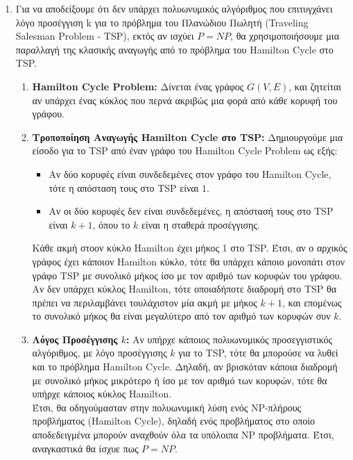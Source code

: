 \documentclass{article}
\begin{document}
\begin{enumerate}[label=(\alph*)]
\item Για να αποδείξουμε ότι δεν υπάρχει πολυωνυμικός αλγόριθμος που επιτυγχάνει λόγο προσέγγιση k για το πρόβλημα του Πλανώδιου Πωλητή (Traveling Salesman Problem - TSP), εκτός αν ισχύει $P = NP$, θα χρησιμοποιήσουμε μια παραλλαγή της κλασικής αναγωγής από το πρόβλημα του Hamilton Cycle στο TSP. \\
\begin{enumerate}[label=\arabic*]
\item \textbf{Hamilton Cycle Problem:} Δίνεται ένας γράφος $G(V,E)$, και ζητείται αν υπάρχει ένας κύκλος που περνά ακριβώς μια φορά από κάθε κορυφή του γράφου. 
\item \textbf{Τροποποίηση Αναγωγής Hamilton Cycle στο TSP:} Δημιουργούμε μια είσοδο για το TSP από έναν γράφο του Hamilton Cycle Problem ως εξής: \\
\begin{itemize} 
\item Αν δύο κορυφές είναι συνδεδεμένες στον γράφο του Hamilton Cycle, τότε η απόσταση τους στο TSP είναι $1$.
\item Αν οι δύο κορυφές δεν είναι συνδεδεμένες, η απόστασή τους στο TSP είναι $k+1$, όπου το $k$ είναι η σταθερά προσέγγισης.
\end{itemize}
Κάθε ακμή στοον κύκλο Hamilton έχει μήκος 1 στο TSP. Έτσι, αν ο αρχικός γράφος έχει κάποιον Hamilton κύκλο, τότε θα υπάρχει κάποιο μονοπάτι στον γράφο TSP με συνολικό μήκος ίσο με τον αριθμό των κορυφών του γράφου. \\
Αν δεν υπάρχει κύκλος Hamilton, τότε οποιαδήποτε διαδρομή στο TSP θα πρέπει να περιλαμβάνει τουλάχιστον μία ακμή με μήκος $k+1$, και επομένως το συνολικό μήκος θα είναι μεγαλύτερο από τον αριθμό των κορυφών συν $k$.
\item \textbf{Λόγος Προσέγγισης $k$:} Αν υπήρχε κάποιος πολυωνυμικός προσεγγιστικός αλγόριθμος, με λόγο προσέγγισης $k$ για το TSP, τότε θα μπορούσε να λυθεί και το πρόβλημα Hamilton Cycle. Δηλαδή, αν βρισκόταν κάποια διαδρομή με συνολικό μήκος μικρότερο ή ίσο με τον αριθμό των κορυφών, τότε θα υπήρχε κάποιος κύκλος Hamilton.  \\
Έτσι, θα οδηγούμασταν στην πολυωνυμική λύση ενός NP-πλήρους προβλήματος (Hamilton Cycle), δηλαδή ενός προβλήματος στο οποίο αποδεδειγμένα μπορούν αναχθούν όλα τα υπόλοιπα NP προβλήματα. Έτσι, αναγκαστικά θα ίσχυε πως $P = NP$.
\end{enumerate}
\end{enumerate}
\end{document}

